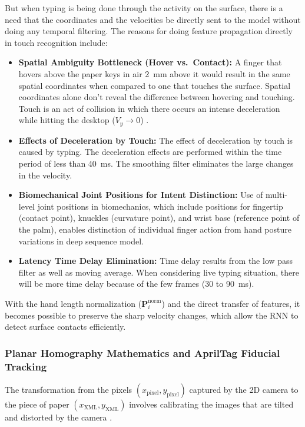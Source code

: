 But when typing is being done through the activity on the surface, there is a need that the coordinates and the velocities be directly sent to the model without doing any temporal filtering. The reasons for doing feature propagation directly in touch recognition include:
\begin{itemize}
    \item \textbf{Spatial Ambiguity Bottleneck (Hover vs.\ Contact):} A finger that hovers above the paper keys in air 2~mm above it would result in the same spatial coordinates when compared to one that touches the surface. Spatial coordinates alone don't reveal the difference between hovering and touching. Touch is an act of collision in which there occurs an intense deceleration while hitting the desktop ($V_y \to 0$) \cite{Srivastava2012RealTime, MacRitchie2015Integrating}.
    \item \textbf{Effects of Deceleration by Touch:} The effect of deceleration by touch is caused by typing. The deceleration effects are performed within the time period of less than 40~ms. The smoothing filter eliminates the large changes in the velocity.
    \item \textbf{Biomechanical Joint Positions for Intent Distinction:} Use of multi-level joint positions in biomechanics, which include positions for fingertip (contact point), knuckles (curvature point), and wrist base (reference point of the palm), enables distinction of individual finger action from hand posture variations in deep sequence model.
    \item \textbf{Latency Time Delay Elimination:} Time delay results from the low pass filter as well as moving average. When considering live typing situation, there will be more time delay because of the few frames (30 to 90~ms).
\end{itemize}

With the hand length normalization ($\mathbf{P}_i^{\text{norm}}$) and the direct transfer of features, it becomes possible to preserve the sharp velocity changes, which allow the RNN to detect surface contacts efficiently.

\subsubsection{Planar Homography Mathematics and AprilTag Fiducial Tracking}
The transformation from the pixels $(x_{\text{pixel}}, y_{\text{pixel}})$ captured by the 2D camera to the piece of paper $(x_{\text{XML}}, y_{\text{XML}})$ involves calibrating the images that are tilted and distorted by the camera \cite{LonguetHiggins1985Machine, Pirchheim2011Homography, Wang2020Relative}.

